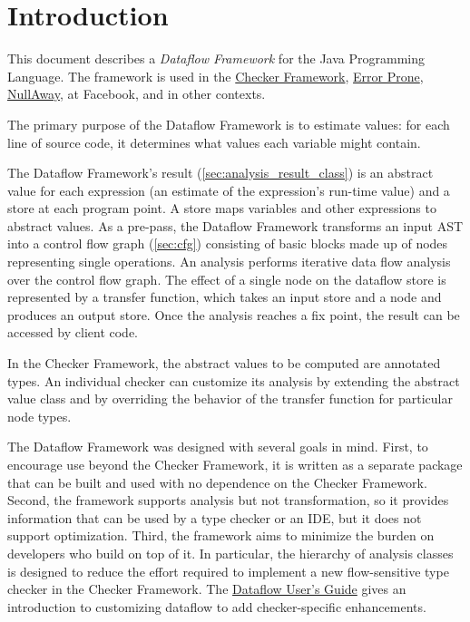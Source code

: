 
\section{Introduction}

This document describes a \emph{Dataflow Framework} for the Java
Programming Language.  The framework is used in the
\href{https://checkerframework.org/}{Checker Framework},
\href{http://errorprone.info/}{Error Prone},
\href{https://github.com/uber/NullAway}{NullAway},
at Facebook, and in other contexts.

The primary purpose of the Dataflow Framework is to estimate values:
for each line of source code, it determines what
values each variable might contain.

The Dataflow Framework's result (\autoref{sec:analysis_result_class})
is an abstract value for each expression (an estimate of the
expression's run-time value) and a store at each program point.  A
store maps variables and other expressions to abstract
values.  As a pre-pass, the Dataflow Framework transforms an input
AST into a control flow graph (\autoref{sec:cfg}) consisting of basic
blocks made up of nodes representing single operations.  An analysis
performs iterative data flow
analysis over the control flow graph.  The effect of a single node on
the dataflow store is represented by a transfer function, which takes
an input store and a node and produces an output store.  Once the
analysis reaches a fix point, the result can be accessed by client
code.

In the Checker Framework, the abstract values to be computed are
annotated types.  An individual checker can customize its analysis by
extending the abstract value class and by overriding the behavior of
the transfer function for particular node types.

The Dataflow Framework was
designed with several goals in mind.  First, to encourage use
beyond the Checker Framework, it is written as a separate package that can be
built and used with no dependence on the Checker Framework.  Second,
the framework supports analysis but not
transformation, so it provides information that can be used by a type
checker or an IDE, but it does not support optimization.  Third, the
framework aims to minimize the burden on developers who build on top
of it.  In particular, the hierarchy of analysis classes is designed
to reduce the effort required to implement a new flow-sensitive type
checker in the Checker Framework. The
\href{https://docs.google.com/document/d/1oYzbOrrS4ZEEx4wQgIHbijNzcI5CiQAq_-1NrOS8JME/edit?usp=sharing}{Dataflow User's Guide}
gives an introduction to customizing dataflow to add checker-specific
enhancements.

